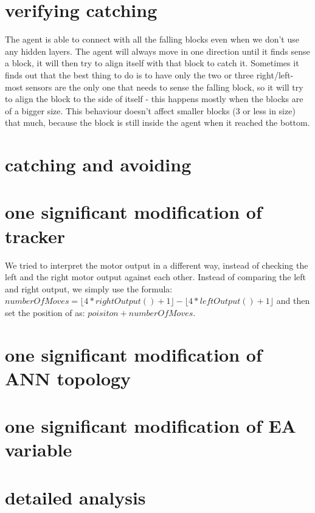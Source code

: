 \documentclass[12pt, a4paper]{article}
\begin{document}
\section{verifying catching}
The agent is able to connect with all the falling blocks even when we don't use any hidden layers. The agent will always move in one direction until it finds sense a block, it will then try to align itself with that block to catch it. Sometimes it finds out that the best thing to do is to have only the two or three right/left-most sensors are the only one that needs to sense the falling block, so it will try to align the block to the side of itself - this happens mostly when the blocks are of a bigger size. This behaviour doesn't affect smaller blocks (3 or less in size) that much, because the block is still inside the agent when it reached the bottom.

\section{catching and avoiding}

\section{one significant modification of tracker}
We tried to interpret the motor output in a different way, instead of checking the left and the right motor output against each other. Instead of comparing the left and right output, we simply use the formula:\\ $numberOfMoves = \lfloor 4*rightOutput()+1 \rfloor - \lfloor 4*leftOutput()+1 \rfloor$
and then set the position of as: $ poisiton + numberOfMoves $.

\section{one significant modification of ANN topology}

\section{one significant modification of EA variable}


\section{detailed analysis}
\end{document}
